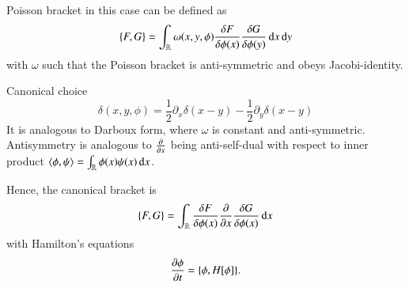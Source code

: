 \begin{definition}Poisson bracket in this case can be defined as 
	\begin{equation*}
		\pb{F}{G} = \int_{\R} \omega(x, y, \phi) \fdv{F}{\phi(x)} \fdv{G}{\phi(y)} \dd{x} \dd{y}
	\end{equation*}
with $\omega$ such that the Poisson bracket is anti-symmetric and obeys Jacobi-identity.
\end{definition}

Canonical choice
\begin{equation*}
	\delta(x, y, \phi) = \frac{1}{2} \partial_x \delta(x-y) - \frac{1}{2} \partial_y \delta(x-y)
\end{equation*}
It is analogous to Darboux form, where $\omega$ is constant and anti-symmetric. Antisymmetry is analogous to $\pdv{x}$ being anti-self-dual with respect to inner product $\langle \phi, \psi \rangle = \int_{\mathbb{R}} \phi(x) \psi(x) \dd{x}$. 

Hence, the canonical bracket is 
\begin{equation*}
	\pb{F}{G} = \int_{\R} \fdv{F}{\phi(x)} \pdv{x} \fdv{G}{\phi(x)} \dd{x}
\end{equation*}
with Hamilton's equations 
\begin{equation}
	\pdv{\phi}{t} = \pb{\phi}{H[\phi]}.
\end{equation}
